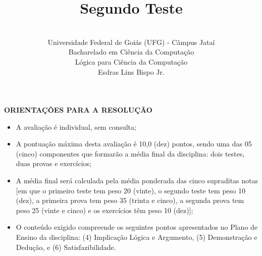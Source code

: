 \documentclass[11pt,a4paper,oneside]{article}
\author{\\Universidade Federal de Goiás (UFG) - Câmpus Jataí\\Bacharelado em Ciência da Computação \\Lógica para Ciência da Computação \\Esdras Lins Bispo Jr.}
\title{\sc \huge Segundo Teste}
\begin{document}
\maketitle

{\bf ORIENTAÇÕES PARA A RESOLUÇÃO}

\begin{itemize}
	\item A avaliação é individual, sem consulta;
	\item A pontuação máxima desta avaliação é 10,0 (dez) pontos, sendo uma das 05 (cinco) componentes que formarão a média final da disciplina: dois testes, duas provas e exercícios;
	\item A média final será calculada pela média ponderada das cinco supraditas notas [em que o primeiro teste tem peso 20 (vinte), o segundo teste tem peso 10 (dez), a primeira prova tem peso 35 (trinta e cinco), a segunda prova tem peso 25 (vinte e cinco) e os exercícios têm peso 10 (dez)];
	\item O conteúdo exigido compreende os seguintes pontos apresentados no Plano de Ensino da disciplina: (4) Implicação Lógica e Argumento, (5) Demonstração e Dedução, e (6) Satisfazibilidade.
\end{itemize}

\begin{center}
\end{center}

\newpage
\end{document}
